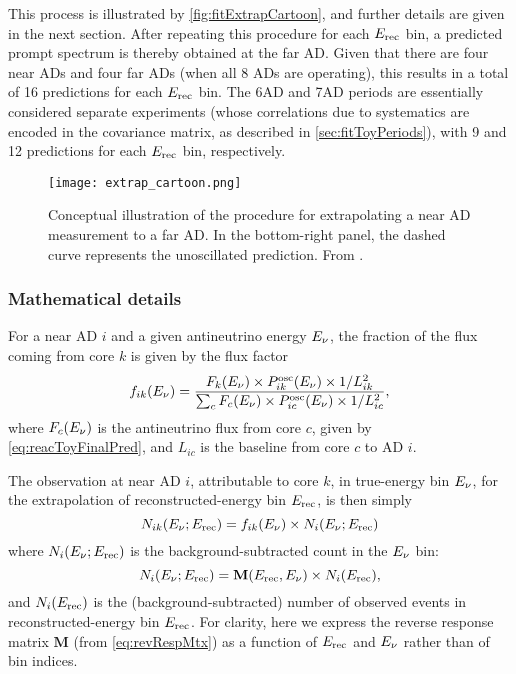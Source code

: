 \documentclass[../thesis.tex]{subfiles}
\begin{document}
This process is illustrated by \autoref{fig:fitExtrapCartoon}, and further details are given in the next section. After repeating this procedure for each $E_\mathrm{rec}$ bin, a predicted prompt spectrum is thereby obtained at the far AD. Given that there are four near ADs and four far ADs (when all 8 ADs are operating), this results in a total of 16 predictions for each $E_\mathrm{rec}$ bin. The 6AD and 7AD periods are essentially considered separate experiments (whose correlations due to systematics are encoded in the covariance matrix, as described in \autoref{sec:fitToyPeriods}), with 9 and 12 predictions for each $E_\mathrm{rec}$ bin, respectively.

\begin{figure}[ht]
  \centering
  \texttt{[image: extrap\_cartoon.png]}
  \caption{Conceptual illustration of the procedure for extrapolating a near AD measurement to a far AD. In the bottom-right panel, the dashed curve represents the unoscillated prediction. From \cite{berkeley_shapefit}.}
  \label{fig:fitExtrapCartoon} 
\end{figure}

\subsubsection{Mathematical details}

For a near AD $i$ and a given antineutrino energy $E_\mathrm{\nu}$, the fraction of the flux coming from core $k$ is given by the flux factor
\begin{equation}
  \label{eq:fitFluxFactor}
  f_{ik}(E_\mathrm{\nu}) = \frac{F_k(E_\mathrm{\nu}) \times P^{\mathrm{osc}}_{ik}(E_\mathrm{\nu}) \times 1/L^2_{ik}}
  {\sum_c F_c(E_\mathrm{\nu}) \times P^{\mathrm{osc}}_{ic}(E_\mathrm{\nu}) \times 1/L^2_{ic}},
\end{equation}
where $F_c(E_\mathrm{\nu})$ is the antineutrino flux from core $c$, given by \autoref{eq:reacToyFinalPred}, and $L_{ic}$ is the baseline from core $c$ to AD $i$.

The observation at near AD $i$, attributable to core $k$, in true-energy bin $E_\mathrm{\nu}$, for the extrapolation of reconstructed-energy bin $E_\mathrm{rec}$, is then simply
\begin{equation}
  N_{ik}(E_\mathrm{\nu}; E_\mathrm{rec}) = f_{ik}(E_\mathrm{\nu}) \times N_i(E_\mathrm{\nu}; E_\mathrm{rec})
\end{equation}
where $N_i(E_\mathrm{\nu}; E_\mathrm{rec})$ is the background-subtracted count in the $E_\mathrm{\nu}$ bin:
\begin{equation}
  N_i(E_\mathrm{\nu}; E_\mathrm{rec}) = \mathbf{M}(E_\mathrm{rec}, E_\mathrm{\nu}) \times N_i(E_\mathrm{rec}),
\end{equation}
and $N_i(E_\mathrm{rec})$ is the (background-subtracted) number of observed events in reconstructed-energy bin $E_\mathrm{rec}$. For clarity, here we express the reverse response matrix $\mathbf{M}$ (from \autoref{eq:revRespMtx}) as a function of $E_\mathrm{rec}$ and $E_\mathrm{\nu}$ rather than of bin indices.
\end{document}

